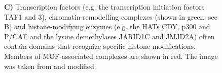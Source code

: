 \begin{figure}
\begin{footnotesize}
{{\textbf{C)} Transcription factors (e.g. the transcription initiation factors TAF1 and 3), chromatin-remodelling complexes (shown in green, see B) and histone-modifying enzymes (e.g. the HATs CDY, p300 and P/CAF and the lysine demethylases JARID1C and JMJD2A) often contain domains that recognize specific histone modifications. Members of MOF-associated complexes are shown in red. The image was taken from \citep{Abcam} and modified.
}}
\label{fig:histonesExtended}
\end{footnotesize}
\end{figure}

